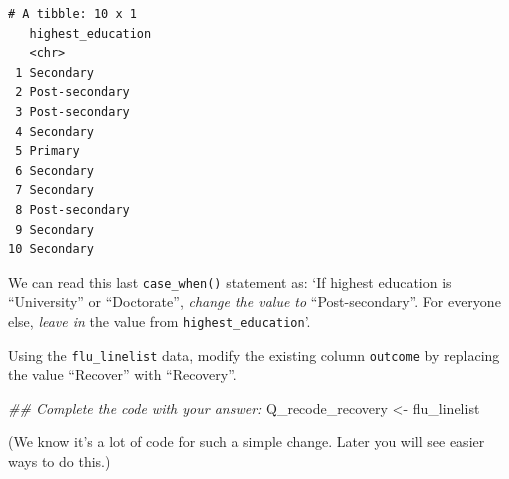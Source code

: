 \documentclass[
  letterpaper,
  DIV=11,
  numbers=noendperiod]{scrreprt}
\newenvironment{Shaded}{\begin{snugshade}}{\end{snugshade}}
\newcommand{\DocumentationTok}[1]{\textcolor[rgb]{0.37,0.37,0.37}{\textit{#1}}}
\newcommand{\NormalTok}[1]{\textcolor[rgb]{0.00,0.23,0.31}{#1}}
\newcommand{\OtherTok}[1]{\textcolor[rgb]{0.00,0.23,0.31}{#1}}
\begin{document}
\begin{verbatim}
# A tibble: 10 x 1
   highest_education
   <chr>            
 1 Secondary        
 2 Post-secondary   
 3 Post-secondary   
 4 Secondary        
 5 Primary          
 6 Secondary        
 7 Secondary        
 8 Post-secondary   
 9 Secondary        
10 Secondary        
\end{verbatim}

We can read this last \texttt{case\_when()} statement as: `If highest
education is ``University'' or ``Doctorate'', \emph{change the value to}
``Post-secondary''. For everyone else, \emph{leave in} the value from
\texttt{highest\_education}'.

\begin{tcolorbox}[enhanced jigsaw, title=\textcolor{quarto-callout-tip-color}{\faLightbulb}\hspace{0.5em}{Practice}, colbacktitle=quarto-callout-tip-color!10!white, leftrule=.75mm, arc=.35mm, opacityback=0, bottomrule=.15mm, rightrule=.15mm, toptitle=1mm, breakable, toprule=.15mm, colback=white, coltitle=black, colframe=quarto-callout-tip-color-frame, bottomtitle=1mm, titlerule=0mm, left=2mm, opacitybacktitle=0.6]

Using the \texttt{flu\_linelist} data, modify the existing column
\texttt{outcome} by replacing the value ``Recover'' with ``Recovery''.

\begin{Shaded}
\begin{Highlighting}[]
\DocumentationTok{\#\# Complete the code with your answer:}
\NormalTok{Q\_recode\_recovery }\OtherTok{\textless{}{-}} 
\NormalTok{  flu\_linelist }
\end{Highlighting}
\end{Shaded}

(We know it's a lot of code for such a simple change. Later you will see
easier ways to do this.)

\end{tcolorbox}
\end{document}
